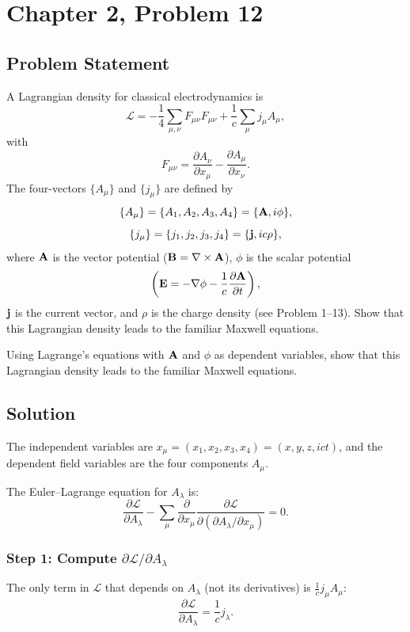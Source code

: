 \documentclass[12pt]{article}
\begin{document}
\section*{Chapter 2, Problem 12}

\subsection*{Problem Statement}
A Lagrangian density for classical electrodynamics is
\[
  \mathscr{L} = -\frac{1}{4}\sum_{\mu,\nu} F_{\mu\nu}F_{\mu\nu} + \frac{1}{c}\sum_\mu j_\mu A_\mu,
\]
with
\[
  F_{\mu\nu} = \frac{\partial A_\nu}{\partial x_\mu} - \frac{\partial A_\mu}{\partial x_\nu}.
\]
The four-vectors $\{A_\mu\}$ and $\{j_\mu\}$ are defined by
\[
  \{A_\mu\} = \{A_1, A_2, A_3, A_4\} = \{{\bf A}, i\phi\},
\]
\[
  \{j_\mu\} = \{j_1, j_2, j_3, j_4\} = \{{\bf j}, ic\rho\},
\]
where ${\bf A}$ is the vector potential (${\bf B} = \nabla\times{\bf A}$), $\phi$ is the scalar potential
\[
  \left({\bf E} = -\nabla\phi - \frac{1}{c}\frac{\partial{\bf A}}{\partial t}\right),
\]
${\bf j}$ is the current vector, and $\rho$ is the charge density (see Problem 1--13). Show that this Lagrangian density leads to the familiar Maxwell equations.

Using Lagrange's equations with ${\bf A}$ and $\phi$ as dependent variables, show that this Lagrangian density leads to the familiar Maxwell equations.

\subsection*{Solution}

The independent variables are $x_\mu = (x_1, x_2, x_3, x_4) = (x, y, z, ict)$, and the dependent field variables are the four components $A_\mu$.

The Euler--Lagrange equation for $A_\lambda$ is:
\[
  \frac{\partial\mathscr{L}}{\partial A_\lambda} - \sum_\mu \frac{\partial}{\partial x_\mu}\frac{\partial\mathscr{L}}{\partial(\partial A_\lambda/\partial x_\mu)} = 0.
\]

\subsubsection*{Step 1: Compute $\partial\mathscr{L}/\partial A_\lambda$}

The only term in $\mathscr{L}$ that depends on $A_\lambda$ (not its derivatives) is $\frac{1}{c}j_\mu A_\mu$:
\[
  \frac{\partial\mathscr{L}}{\partial A_\lambda} = \frac{1}{c}j_\lambda.
\]
\end{document}
